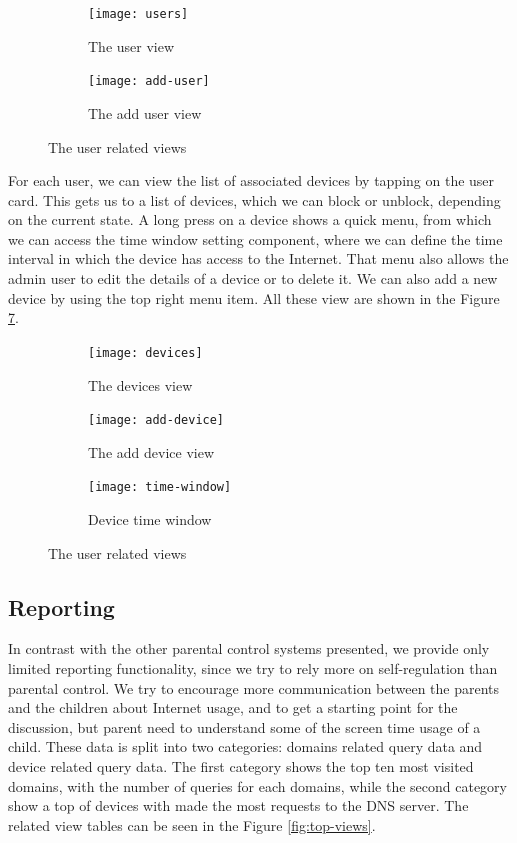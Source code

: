 \begin{figure}
\centering
\begin{subfigure}{.5\textwidth}
  \centering
  \texttt{[image: users]}
  \caption{The user view}
  \label{fig:users}
\end{subfigure}%
\begin{subfigure}{.5\textwidth}
  \centering
  \texttt{[image: add-user]}
  \caption{The add user view}
  \label{fig:add-user}
\end{subfigure}
\caption{The user related views}
\label{fig:user-views}
\end{figure}

For each user, we can view the list of associated devices by tapping on the user card. This gets us to a list of devices, which we can block or unblock, depending on the current state. A long press on a device shows a quick menu, from which we can access the time window setting component, where we can define the time interval in which the device has access to the Internet. That menu also allows the admin user to edit the details of a device or to delete it. We can also add a new device by using the top right menu item. All these view are shown in the Figure \ref{fig:device-views}.

\begin{figure}
\centering
\begin{subfigure}{.33\textwidth}
  \centering
  \texttt{[image: devices]}
  \caption{The devices view}
  \label{fig:devices}
\end{subfigure}%
\begin{subfigure}{.33\textwidth}
  \centering
  \texttt{[image: add-device]}
  \caption{The add device view}
  \label{fig:add-device}
\end{subfigure}
\begin{subfigure}{.33\textwidth}
  \centering
  \texttt{[image: time-window]}
  \caption{Device time window}
  \label{fig:time-window}
\end{subfigure}
\caption{The user related views}
\label{fig:device-views}
\end{figure}

\subsection{Reporting}

In contrast with the other parental control systems presented, we provide only limited reporting functionality, since we try to rely more on self-regulation than parental control. We try to encourage more communication between the parents and the children about Internet usage, and to get a starting point for the discussion, but parent need to understand some of the screen time usage of a child. These data is split into two categories: domains related query data and device related query data. The first category shows the top ten most visited domains, with the number of queries for each domains, while the second category show a top of devices with made the most requests to the DNS server. The related view tables can be seen in the Figure \ref{fig:top-views}.

